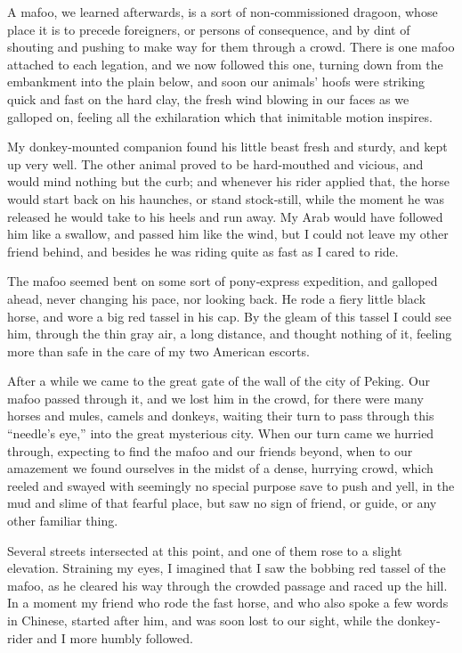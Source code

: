 \documentclass[12pt]{book}
\begin{document}
A mafoo, we learned afterwards, is a sort of non‐commissioned dragoon,
whose place it is to precede foreigners, or persons of consequence, and by dint
of shouting and pushing to make way for them through a crowd. There is one
mafoo attached to each legation, and we now followed this one, turning down
from the embankment into the plain below, and soon our animals’ hoofs were
striking quick and fast on the hard clay, the fresh wind blowing in our faces as
we galloped on, feeling all the exhilaration which that inimitable motion inspires.

My donkey‐mounted companion found his little beast fresh and sturdy, and
kept up very well. The other animal proved to be hard‐mouthed and vicious, and
would mind nothing but the curb; and whenever his rider applied that, the horse
would start back on his haunches, or stand stock‐still, while the moment he was
released he would take to his heels and run away. My Arab would have followed
him like a swallow, and passed him like the wind, but I could not leave my other
friend behind, and besides he was riding quite as fast as I cared to ride.

The mafoo seemed bent on some sort of pony‐express expedition, and galloped
ahead, never changing his pace, nor looking back. He rode a fiery little black
horse, and wore a big red tassel in his cap. By the gleam of this tassel I could see
him, through the thin gray air, a long distance, and thought nothing of it, feeling
more than safe in the care of my two American escorts.

After a while we came to the great gate of the wall of the city of Peking. Our
mafoo passed through it, and we lost him in the crowd, for there were many horses
and mules, camels and donkeys, waiting their turn to pass through this “needle’s
eye,” into the great mysterious city. When our turn came we hurried through,
expecting to find the mafoo and our friends beyond, when to our amazement we
found ourselves in the midst of a dense, hurrying crowd, which reeled and swayed
with seemingly no special purpose save to push and yell, in the mud and slime of
that fearful place, but saw no sign of friend, or guide, or any other familiar thing.

Several streets intersected at this point, and one of them rose to a slight
elevation. Straining my eyes, I imagined that I saw the bobbing red tassel of
the mafoo, as he cleared his way through the crowded passage and raced up the
hill. In a moment my friend who rode the fast horse, and who also spoke a few
words in Chinese, started after him, and was soon lost to our sight, while the
donkey‐rider and I more humbly followed.
\end{document}
